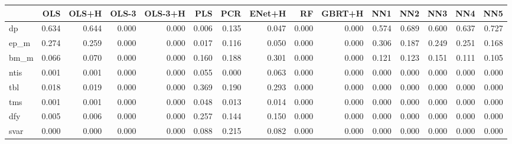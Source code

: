\begin{tabular}{lrrrrrrrrrrrrrr}
\toprule
 & OLS & OLS+H & OLS-3 & OLS-3+H & PLS & PCR & ENet+H & RF & GBRT+H & NN1 & NN2 & NN3 & NN4 & NN5 \\
\midrule
dp & 0.634 & 0.644 & 0.000 & 0.000 & 0.006 & 0.135 & 0.047 & 0.000 & 0.000 & 0.574 & 0.689 & 0.600 & 0.637 & 0.727 \\
ep_m & 0.274 & 0.259 & 0.000 & 0.000 & 0.017 & 0.116 & 0.050 & 0.000 & 0.000 & 0.306 & 0.187 & 0.249 & 0.251 & 0.168 \\
bm_m & 0.066 & 0.070 & 0.000 & 0.000 & 0.160 & 0.188 & 0.301 & 0.000 & 0.000 & 0.121 & 0.123 & 0.151 & 0.111 & 0.105 \\
ntis & 0.001 & 0.001 & 0.000 & 0.000 & 0.055 & 0.000 & 0.063 & 0.000 & 0.000 & 0.000 & 0.000 & 0.000 & 0.000 & 0.000 \\
tbl & 0.018 & 0.019 & 0.000 & 0.000 & 0.369 & 0.190 & 0.293 & 0.000 & 0.000 & 0.000 & 0.000 & 0.000 & 0.000 & 0.000 \\
tms & 0.001 & 0.001 & 0.000 & 0.000 & 0.048 & 0.013 & 0.014 & 0.000 & 0.000 & 0.000 & 0.000 & 0.000 & 0.000 & 0.000 \\
dfy & 0.005 & 0.006 & 0.000 & 0.000 & 0.257 & 0.144 & 0.150 & 0.000 & 0.000 & 0.000 & 0.000 & 0.000 & 0.000 & 0.000 \\
svar & 0.000 & 0.000 & 0.000 & 0.000 & 0.088 & 0.215 & 0.082 & 0.000 & 0.000 & 0.000 & 0.000 & 0.000 & 0.000 & 0.000 \\
\bottomrule
\end{tabular}
